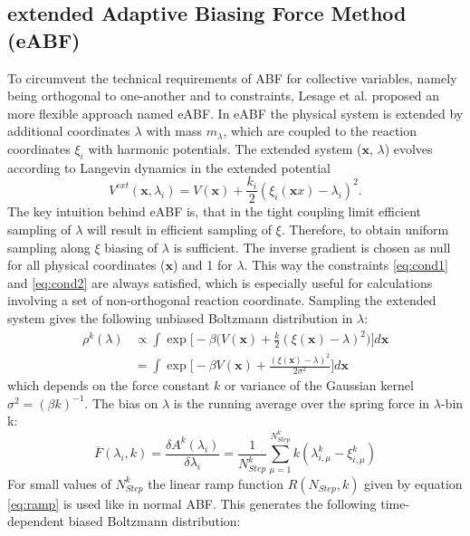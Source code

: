 \subsection{extended Adaptive Biasing Force Method (eABF)}
\label{sec:eABF}
To circumvent the technical requirements of ABF for collective variables, namely being orthogonal to one-another and to constraints, Lesage et al.\autocite{lesage2017smoothed} proposed an more flexible approach named eABF.
In eABF the physical system is extended by additional coordinates $\lambda$ with mass $m_{\lambda}$, which are coupled to the reaction coordinates $\xi_i$ with harmonic potentials. The extended system ($\textbf{x}$, $\lambda$) evolves according to Langevin dynamics in the extended potential
\begin{equation}
  V^{ext}(\textbf{x},\lambda_i) = V(\textbf{x}) + \frac{k_i}{2}(\xi_{i}(\textbf{x}x)-\lambda_i)^2.
\end{equation}
The key intuition behind eABF is, that in the tight coupling limit efficient sampling of $\lambda$ will result in efficient sampling of $\xi$. Therefore, to obtain uniform sampling along $\xi$ biasing of $\lambda$ is sufficient. The inverse gradient is chosen as null for all physical coordinates ($\textbf{x}$) and 1 for $\lambda$. This way the constraints \ref{eq:cond1} and \ref{eq:cond2} are always satisfied, which is especially useful for calculations involving a set of non-orthogonal reaction coordinate.
Sampling the extended system gives the following unbiased Boltzmann distribution in $\lambda$:
\begin{equation}
\begin{aligned}
  \rho^k(\lambda) &\propto
  \int \exp \biggl[-\beta \biggl(V(\textbf{x})+\frac{k}{2}(\xi(\textbf{x})-\lambda)^2 \biggr) \biggr] d\textbf{x} \\
  &= \int \exp \biggl[-\beta V(\textbf{x})+\frac{(\xi(\textbf{x})-\lambda)^2}{2\sigma^2} \biggr] d\textbf{x}
\end{aligned}
\end{equation}
which depends on the force constant $k$ or variance of the Gaussian kernel $\sigma^2=(\beta k)^{-1}$.
The bias on $\lambda$ is the running average over the spring force in $\lambda$-bin k:
\begin{equation}
  \overline{F}(\lambda_{i}, k) = \frac{\delta A^{k}(\lambda_{i})}{\delta \lambda_i} = \frac{1}{N_{Step}^{k}} \sum_{\mu=1}^{N_{Step}^{k}} k(\lambda_{i,\mu}^{k}-\xi_{i,\mu}^{k})
\end{equation}
For small values of $N_{Step}^{k}$ the linear ramp function $R(N_{Step},k)$ given by equation \ref{eq:ramp} is used like in normal ABF. This generates the following time-dependent biased Boltzmann distribution:
